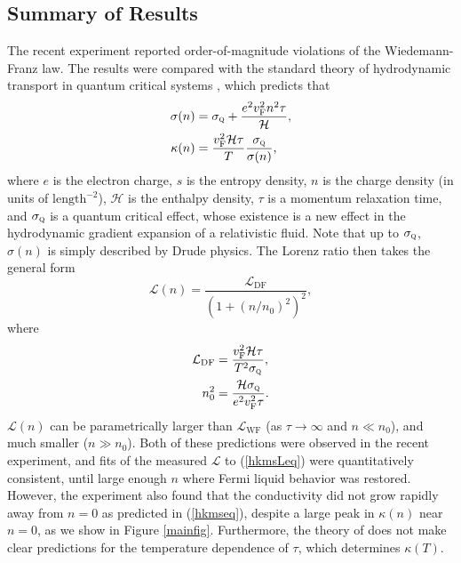 \documentclass[10pt, oneside]{book}
\begin{document}
\begin{doublespace}
\subsection{Summary of Results}
The recent experiment \cite{Crossno1058} reported order-of-magnitude violations of the Wiedemann-Franz law.   The results were compared with the standard theory of hydrodynamic transport in quantum critical systems \cite{hkms}, which predicts that \begin{subequations}\label{hkmseq}\begin{align}
\sigma(n) &= \sigma_{\textsc{q}} + \frac{e^2v_{\mathrm{F}}^2n^2\tau}{\mathcal{H}}, \\
\kappa(n) &= \frac{v_{\mathrm{F}}^2\mathcal{H}\tau}{T}  \frac{\sigma_{\textsc{q}}}{\sigma(n)},
\end{align}\end{subequations}
where $e$ is the electron charge, $s$ is the entropy density, $n$ is the charge density (in units of $\mathrm{length}^{-2}$),  $\mathcal{H}$ is the enthalpy
 density,  $\tau$ is a momentum relaxation time, and $\sigma_{\textsc{q}}$ is a quantum critical effect,  whose existence is a new effect in the hydrodynamic gradient expansion of a relativistic fluid.   Note that up to $\sigma_{\textsc{q}}$,  $\sigma(n)$ is simply described by Drude physics.  The Lorenz ratio then takes the general form \begin{equation}
\mathcal{L}(n) = \frac{\mathcal{L}_{\mathrm{DF}}}{(1+(n/n_0)^2)^2},  \label{hkmsLeq}
\end{equation}
 where
\begin{subequations}\begin{align}
\mathcal{L}_{\mathrm{DF}} &= \frac{v_{\mathrm{F}}^2\mathcal{H}\tau}{T^2\sigma_{\textsc{q}}}, \\
n_0^2 &= \frac{\mathcal{H} \sigma_{\textsc{q}}}{e^2 v_{\mathrm{F}}^2 \tau}.
\end{align}\end{subequations}
$\mathcal{L}(n)$ can be parametrically larger than $\mathcal{L}_{\mathrm{WF}}$ (as $\tau\rightarrow\infty$ and $n\ll n_0$),  and much smaller ($n\gg n_0$).    Both of these predictions were observed in the recent experiment,  and fits of the measured $\mathcal{L}$ to (\ref{hkmsLeq}) were quantitatively consistent,  until large enough $n$ where Fermi liquid behavior was restored.    However, the experiment also found that the conductivity did not grow rapidly away from $n=0$ as predicted in (\ref{hkmseq}), despite a large peak in $\kappa(n)$ near $n=0$,  as we show in Figure \ref{mainfig}.   Furthermore, the theory of \cite{hkms} does not make clear predictions for the temperature dependence of $\tau$, which determines $\kappa(T)$.



\end{doublespace}
\end{document}
